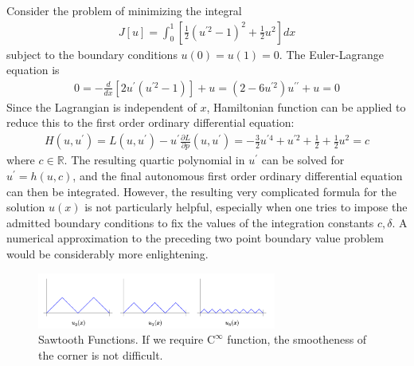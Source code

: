 \documentclass{article}
\begin{document}
Consider the problem of minimizing the integral
\begin{align}
J[u]=\int_{0}^{1}\left[\frac{1}{2}\left(u^{\prime 2}-1\right)^{2}+\frac{1}{2} u^{2}\right] d x
\end{align}
subject to the boundary conditions $u(0)=u(1)=0$. The Euler-Lagrange equation is
\begin{align}
0=-\frac{d}{d x}\left[2 u^{\prime}\left(u^{\prime 2}-1\right)\right]+u=\left(2-6 u^{\prime 2}\right) u^{\prime \prime}+u=0
\end{align}
Since the Lagrangian is independent of $x$, Hamiltonian function can be applied to reduce this to the first order ordinary differential equation:
\begin{align*}
H\left(u, u^{\prime}\right)=L\left(u, u^{\prime}\right)-u^{\prime} \frac{\partial L}{\partial p}\left(u, u^{\prime}\right)=-\frac{3}{2} u^{\prime 4}+u^{\prime 2}+\frac{1}{2}+\frac{1}{2} u^{2}=c
\end{align*}
where $c \in \mathbb{R}$. The resulting quartic polynomial in $u^{\prime}$ can be solved for $u^{\prime}=h(u, c)$, and the final autonomous first order ordinary differential equation can then be integrated. However, the resulting very complicated formula for the solution $u(x)$ is not particularly helpful, especially when one tries to impose the admitted boundary conditions to fix the values of the integration constants $c, \delta$. A numerical approximation to the preceding two point boundary value problem would be considerably more enlightening.
\begin{figure}[ht]
    \centering
    \includegraphics[width=0.7\textwidth]{Figs/a7.png}
    \caption{Sawtooth Functions. If we require $\mathrm{C}^{\infty}$ function, the smootheness of the corner is not difficult.}
    \label{fig:Sawtooth}
\end{figure}
\end{document}
